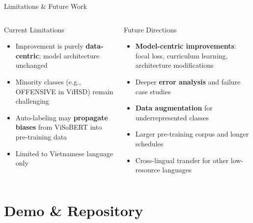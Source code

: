 \documentclass[10pt, aspectratio=169]{beamer}
\begin{document}
\begin{frame}[shrink=5]{Limitations \& Future Work}
  \begin{columns}[T]
    \begin{alertblock}{Current Limitations}
      \begin{itemize}
        \item Improvement is purely \textbf{data-centric}; model architecture unchanged
        \item Minority classes (e.g., OFFENSIVE in ViHSD) remain challenging
        \item Auto-labeling may \textbf{propagate biases} from ViSoBERT into pre-training data
        \item Limited to Vietnamese language only
      \end{itemize}
    \end{alertblock}

    \begin{exampleblock}{Future Directions}
      \begin{itemize}
        \item \textbf{Model-centric improvements}: focal loss, curriculum learning, architecture modifications
        \item Deeper \textbf{error analysis} and failure case studies
        \item \textbf{Data augmentation} for underrepresented classes
        \item Larger pre-training corpus and longer schedules
        \item Cross-lingual transfer for other low-resource languages
      \end{itemize}
    \end{exampleblock}
  \end{columns}
\end{frame}

\section{Demo \& Repository}
\end{document}
